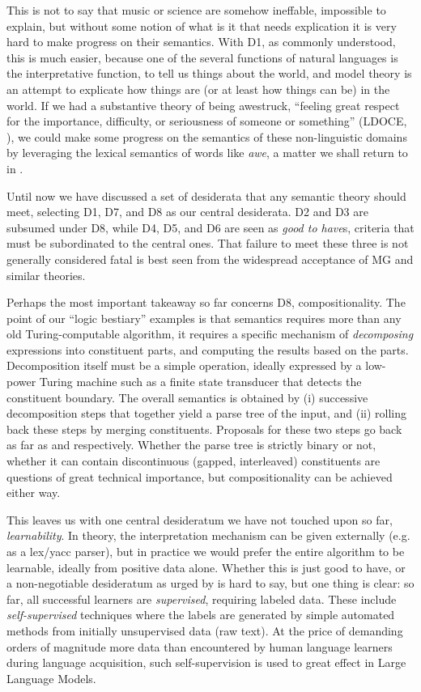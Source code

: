 \documentclass[output=paper,colorlinks=true,citecolor=brown]{langscibook}
\begin{document}
This is not to say that music or science are somehow ineffable, impossible to
explain, but without some notion of what is it that needs explication it is
very hard to make progress on their semantics. With D1, as commonly
understood, this is much easier, because one of the several functions of
natural languages is the interpretative function, to tell us things about the
world, and model theory is an attempt to explicate how things are (or at least
how things can be) in the world. If we had a substantive theory of being
awestruck, ``feeling great respect for the importance, difficulty, or
seriousness of someone or something'' (LDOCE, \cite{Procter:1978}), we could
make some progress on the semantics of these non-linguistic domains by
leveraging the lexical semantics of words like \textit{awe}, a matter we shall
return to in .

Until now we have discussed a set of desiderata that any
semantic theory should meet, selecting D1, D7, and D8 as our central
desiderata. D2 and D3 are subsumed under D8, while D4, D5, and D6 are seen as
\textit{good to have}s, criteria that must be subordinated to the central
ones. That failure to meet these three is not generally considered fatal is
best seen from the widespread acceptance of MG and similar theories.

Perhaps the most important takeaway so far concerns D8, compositionality. The
point of our ``logic bestiary'' examples is that semantics requires more than
any old Turing-computable algorithm, it requires a specific mechanism of \textit{  decomposing} expressions into constituent parts, and computing the results
based on the parts. Decomposition itself must be a simple operation, ideally
expressed by a low-power Turing machine such as a finite state transducer that
detects the constituent boundary. The overall semantics is obtained by (i)
successive decomposition steps that together yield a parse tree of the input,
and (ii) rolling back these steps by merging constituents. Proposals for these
two steps go back as far as \citet{Wells:1947} and \citet{Knuth:1968}
respectively. Whether the parse tree is strictly binary or not, whether it can
contain discontinuous (gapped, interleaved) constituents are questions of
great technical importance, but compositionality can be achieved either way.

This leaves us with one central desideratum we have not touched upon so far,
\textit{learnability}. In theory, the interpretation mechanism can be given
externally (e.g. as a lex/yacc parser), but in practice we would prefer the
entire algorithm to be learnable, ideally from positive data alone. Whether
this is just good to have, or a non-negotiable desideratum as urged by
\citet{Chomsky:1965} is hard to say, but one thing is clear: so far, all
successful learners are \textit{supervised}, requiring labeled data. These
include \textit{self-supervised} techniques where the labels are generated by
simple automated methods from initially unsupervised data (raw text). At the
price of demanding orders of magnitude more data than encountered by human
language learners during language acquisition, such self-supervision is used
to great effect in Large Language Models.
\end{document}
